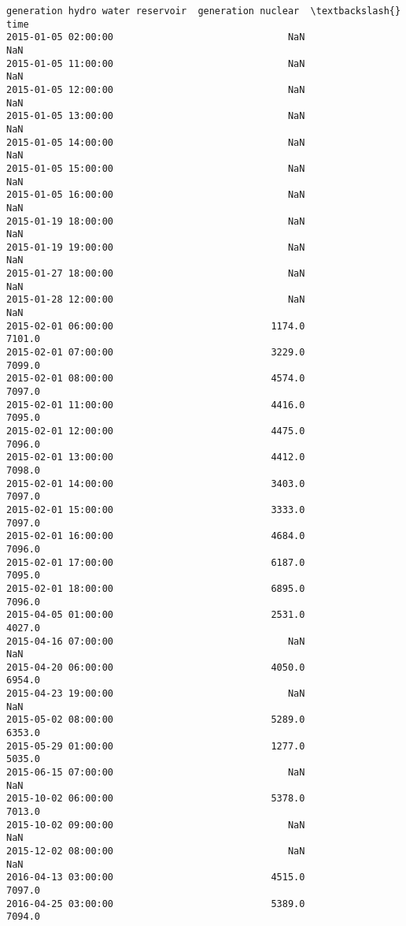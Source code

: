 \documentclass[11pt]{article}
\begin{document}
\begin{tcolorbox}[breakable, size=fbox, boxrule=.5pt, pad at break*=1mm, opacityfill=0]
\begin{Verbatim}[commandchars=\\\{\}]
                     generation hydro water reservoir  generation nuclear  \textbackslash{}
time
2015-01-05 02:00:00                               NaN                 NaN
2015-01-05 11:00:00                               NaN                 NaN
2015-01-05 12:00:00                               NaN                 NaN
2015-01-05 13:00:00                               NaN                 NaN
2015-01-05 14:00:00                               NaN                 NaN
2015-01-05 15:00:00                               NaN                 NaN
2015-01-05 16:00:00                               NaN                 NaN
2015-01-19 18:00:00                               NaN                 NaN
2015-01-19 19:00:00                               NaN                 NaN
2015-01-27 18:00:00                               NaN                 NaN
2015-01-28 12:00:00                               NaN                 NaN
2015-02-01 06:00:00                            1174.0              7101.0
2015-02-01 07:00:00                            3229.0              7099.0
2015-02-01 08:00:00                            4574.0              7097.0
2015-02-01 11:00:00                            4416.0              7095.0
2015-02-01 12:00:00                            4475.0              7096.0
2015-02-01 13:00:00                            4412.0              7098.0
2015-02-01 14:00:00                            3403.0              7097.0
2015-02-01 15:00:00                            3333.0              7097.0
2015-02-01 16:00:00                            4684.0              7096.0
2015-02-01 17:00:00                            6187.0              7095.0
2015-02-01 18:00:00                            6895.0              7096.0
2015-04-05 01:00:00                            2531.0              4027.0
2015-04-16 07:00:00                               NaN                 NaN
2015-04-20 06:00:00                            4050.0              6954.0
2015-04-23 19:00:00                               NaN                 NaN
2015-05-02 08:00:00                            5289.0              6353.0
2015-05-29 01:00:00                            1277.0              5035.0
2015-06-15 07:00:00                               NaN                 NaN
2015-10-02 06:00:00                            5378.0              7013.0
2015-10-02 09:00:00                               NaN                 NaN
2015-12-02 08:00:00                               NaN                 NaN
2016-04-13 03:00:00                            4515.0              7097.0
2016-04-25 03:00:00                            5389.0              7094.0

\end{Verbatim}
\end{tcolorbox}
\end{document}
